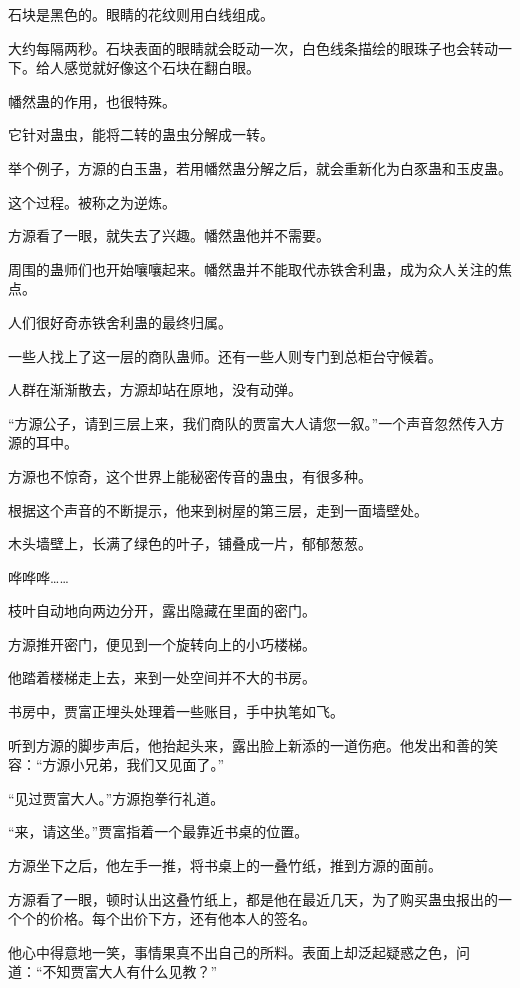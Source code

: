 \begin{this_body}
石块是黑色的。眼睛的花纹则用白线组成。

大约每隔两秒。石块表面的眼睛就会眨动一次，白色线条描绘的眼珠子也会转动一下。给人感觉就好像这个石块在翻白眼。

幡然蛊的作用，也很特殊。

它针对蛊虫，能将二转的蛊虫分解成一转。

举个例子，方源的白玉蛊，若用幡然蛊分解之后，就会重新化为白豕蛊和玉皮蛊。

这个过程。被称之为逆炼。

方源看了一眼，就失去了兴趣。幡然蛊他并不需要。

周围的蛊师们也开始嚷嚷起来。幡然蛊并不能取代赤铁舍利蛊，成为众人关注的焦点。

人们很好奇赤铁舍利蛊的最终归属。

一些人找上了这一层的商队蛊师。还有一些人则专门到总柜台守候着。

人群在渐渐散去，方源却站在原地，没有动弹。

“方源公子，请到三层上来，我们商队的贾富大人请您一叙。”一个声音忽然传入方源的耳中。

方源也不惊奇，这个世界上能秘密传音的蛊虫，有很多种。

根据这个声音的不断提示，他来到树屋的第三层，走到一面墙壁处。

木头墙壁上，长满了绿色的叶子，铺叠成一片，郁郁葱葱。

哗哗哗……

枝叶自动地向两边分开，露出隐藏在里面的密门。

方源推开密门，便见到一个旋转向上的小巧楼梯。

他踏着楼梯走上去，来到一处空间并不大的书房。

书房中，贾富正埋头处理着一些账目，手中执笔如飞。

听到方源的脚步声后，他抬起头来，露出脸上新添的一道伤疤。他发出和善的笑容：“方源小兄弟，我们又见面了。”

“见过贾富大人。”方源抱拳行礼道。

“来，请这坐。”贾富指着一个最靠近书桌的位置。

方源坐下之后，他左手一推，将书桌上的一叠竹纸，推到方源的面前。

方源看了一眼，顿时认出这叠竹纸上，都是他在最近几天，为了购买蛊虫报出的一个个的价格。每个出价下方，还有他本人的签名。

他心中得意地一笑，事情果真不出自己的所料。表面上却泛起疑惑之色，问道：“不知贾富大人有什么见教？”


\end{this_body}
